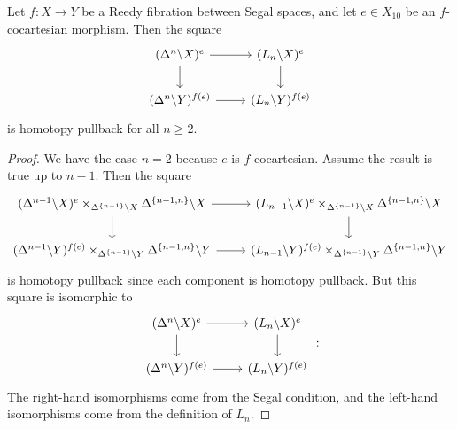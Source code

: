 \documentclass[main.tex]{subfiles}
\begin{document}
\begin{proposition}
  \label{prop:only_lowest_lifting_condition_is_necessary}
  Let $f\colon X \to Y$ be a Reedy fibration between Segal spaces, and let $e \in X_{10}$ be an $f$-cocartesian morphism. Then the square
  \begin{equation*}
    \begin{tikzcd}
      (\Delta^{n} \backslash X)^{e}
      \arrow[r]
      \arrow[d]
      & (L_{n} \backslash X)^{e}
      \arrow[d]
      \\
      (\Delta^{n} \backslash Y)^{f(e)}
      \arrow[r]
      & (L_{n} \backslash Y)^{f(e)}
    \end{tikzcd}
  \end{equation*}
  is homotopy pullback for all $n \geq 2$.
\end{proposition}
\begin{proof}
  We have the case $n = 2$ because $e$ is $f$-cocartesian. Assume the result is true up to $n - 1$. Then the square
  \begin{equation*}
    \begin{tikzcd}
      (\Delta^{n-1} \backslash X)^{e} \times_{\Delta^{\{n-1\}} \backslash X} \Delta^{\{n-1, n\}} \backslash X
      \arrow[r]
      \arrow[d]
      & (L_{n-1} \backslash X)^{e} \times_{\Delta^{\{n-1\}} \backslash X} \Delta^{\{n-1, n\}} \backslash X
      \arrow[d]
      \\
      (\Delta^{n-1} \backslash Y)^{f(e)} \times_{\Delta^{\{n-1\}} \backslash Y} \Delta^{\{n-1, n\}} \backslash Y
      \arrow[r]
      & (L_{n-1} \backslash Y)^{f(e)} \times_{\Delta^{\{n-1\}} \backslash Y} \Delta^{\{n-1, n\}} \backslash Y
    \end{tikzcd}
  \end{equation*}
  is homotopy pullback since each component is homotopy pullback. But this square is isomorphic to
  \begin{equation*}
    \begin{tikzcd}
      (\Delta^{n} \backslash X)^{e}
      \arrow[r]
      \arrow[d]
      & (L_{n} \backslash X)^{e}
      \arrow[d]
      \\
      (\Delta^{n} \backslash Y)^{f(e)}
      \arrow[r]
      & (L_{n} \backslash Y)^{f(e)}
    \end{tikzcd}:
  \end{equation*}
  The right-hand isomorphisms come from the Segal condition, and the left-hand isomorphisms come from the definition of $L_{n}$.
\end{proof}
\end{document}
